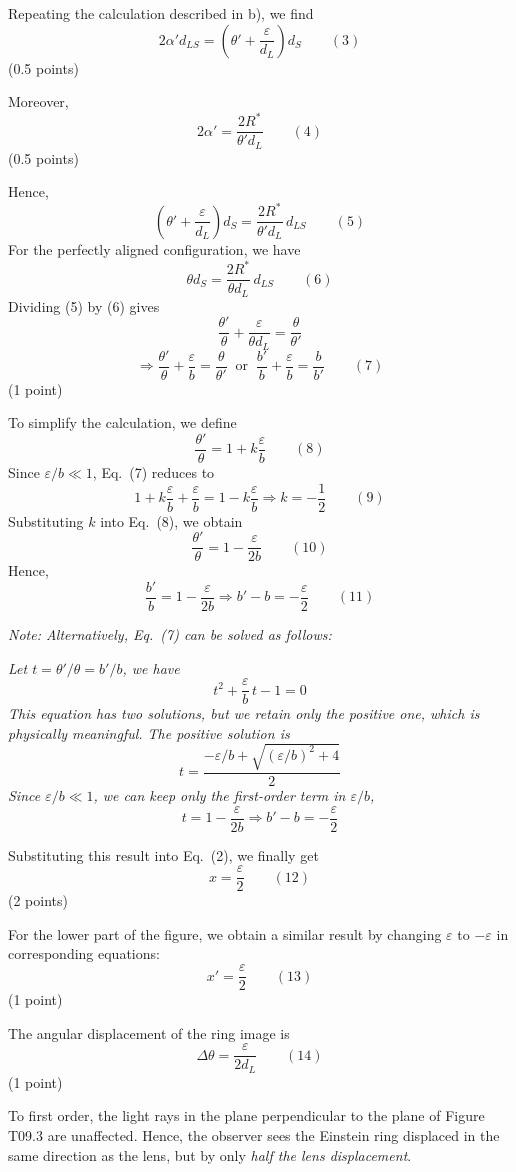 \begin{description}
  Repeating the calculation described in b), we find
  \[ 2\alpha' d_{LS} = \left(\theta' + \frac{\varepsilon}{d_L}\right) d_S
     \qquad (3) \]
  \hfill(0.5 points)

  Moreover,
  \[ 2\alpha' = \frac{2R^*}{\theta' d_L} \qquad (4) \]
  \hfill(0.5 points)

  Hence,
  \[ \left(\theta' + \frac{\varepsilon}{d_L}\right) d_S
     = \frac{2R^*}{\theta' d_L}\, d_{LS} \qquad (5) \]
  For the perfectly aligned configuration, we have
  \[ \theta d_S = \frac{2R^*}{\theta d_L}\, d_{LS} \qquad (6) \]
  Dividing (5) by (6) gives
  \[ \frac{\theta'}{\theta} + \frac{\varepsilon}{\theta d_L}
     = \frac{\theta}{\theta'} \]
  \[ \Rightarrow \frac{\theta'}{\theta} + \frac{\varepsilon}{b}
     = \frac{\theta}{\theta'}
     \ \text{ or }\
     \frac{b'}{b} + \frac{\varepsilon}{b} = \frac{b}{b'} \qquad (7) \]
  \hfill(1 point)

  To simplify the calculation, we define
  \[ \frac{\theta'}{\theta} = 1 + k\frac{\varepsilon}{b} \qquad (8) \]
  Since $\varepsilon/b \ll 1$, Eq.\ (7) reduces to
  \[ 1 + k\frac{\varepsilon}{b} + \frac{\varepsilon}{b}
     = 1 - k\frac{\varepsilon}{b}
     \Rightarrow k = -\frac{1}{2} \qquad (9) \]
  Substituting $k$ into Eq.\ (8), we obtain
  \[ \frac{\theta'}{\theta} = 1 - \frac{\varepsilon}{2b} \qquad (10) \]
  Hence,
  \[ \frac{b'}{b} = 1 - \frac{\varepsilon}{2b}
     \Rightarrow b' - b = -\frac{\varepsilon}{2} \qquad (11) \]

  \textit{Note: Alternatively, Eq.\ (7) can be solved as follows:}

  \textit{Let $t = \theta'/\theta = b'/b$, we have}
  \[ t^2 + \frac{\varepsilon}{b}\,t - 1 = 0 \]
  \textit{This equation has two solutions, but we retain only the positive
  one, which is physically meaningful. The positive solution is}
  \[ t = \frac{-\varepsilon/b + \sqrt{(\varepsilon/b)^2 + 4}}{2} \]
  \textit{Since $\varepsilon/b \ll 1$, we can keep only the first-order term
  in $\varepsilon/b$,}
  \[ t = 1 - \frac{\varepsilon}{2b}
     \Rightarrow b' - b = -\frac{\varepsilon}{2} \]

  Substituting this result into Eq.\ (2), we finally get
  \[ x = \frac{\varepsilon}{2} \qquad (12) \]
  \hfill(2 points)

  For the lower part of the figure, we obtain a similar result by changing
  $\varepsilon$ to $-\varepsilon$ in corresponding equations:
  \[ x' = \frac{\varepsilon}{2} \qquad (13) \]
  \hfill(1 point)

  The angular displacement of the ring image is
  \[ \Delta\theta = \frac{\varepsilon}{2 d_L} \qquad (14) \]
  \hfill(1 point)

  To first order, the light rays in the plane perpendicular to the plane of
  Figure T09.3 are unaffected. Hence, the observer sees the Einstein ring
  displaced in the same direction as the lens, but by only \textit{half the
  lens displacement}.
\end{description}

